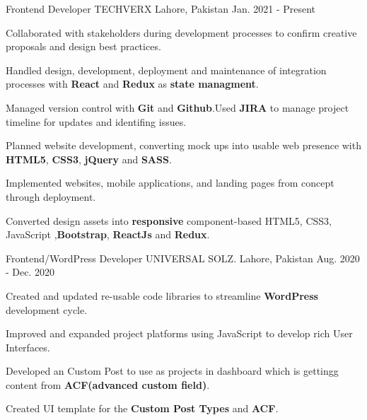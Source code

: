 

\begin{cventries}

  \cventry
    {Frontend Developer} %
    {TECHVERX} %
    {Lahore, Pakistan} %
    {Jan. 2021 - Present} %
    {
      \begin{cvitems} %
        \item {Collaborated with stakeholders during development processes to confirm creative proposals and design best practices.}
        \item {Handled design, development, deployment and maintenance of integration processes with \textbf{React} and \textbf{Redux} as \textbf{state managment}.}
        \item {Managed version control with \textbf{Git} and \textbf{Github}.Used \textbf{JIRA} to manage project timeline for updates and identifing issues.}
        \item {Planned website development, converting mock ups into usable web presence with \textbf{HTML5}, \textbf{CSS3}, \textbf{jQuery} and \textbf{SASS}.}
        \item {Implemented websites, mobile applications, and landing pages from concept through deployment.}
        \item {Converted design assets into \textbf{responsive} component-based HTML5, CSS3, JavaScript ,\textbf{Bootstrap}, \textbf{ReactJs} and \textbf{Redux}.}
      \end{cvitems}
    }

  \cventry
    {Frontend/WordPress Developer} %
    {UNIVERSAL SOLZ.} %
    {Lahore, Pakistan} %
    {Aug. 2020 - Dec. 2020} %
    {
      \begin{cvitems} %
        \item {Created and updated re-usable code libraries to streamline \textbf{WordPress} development cycle.}
        \item {Improved and expanded project platforms using JavaScript to develop rich User Interfaces.}
        \item {Developed an Custom Post to use as projects in dashboard which is gettingg content from \textbf{ACF(advanced custom field)}.}
        \item {Created UI template for the \textbf{Custom Post Types} and \textbf{ACF}.}
      \end{cvitems}
    }


\end{cventries}
